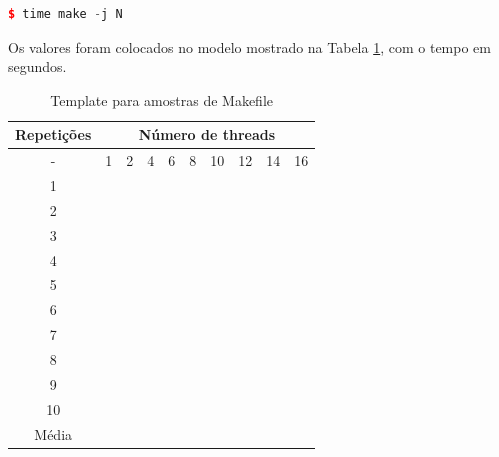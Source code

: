 \begin{lstlisting}[language=C++,caption={
							Execução de make utilizando jobs},
                                   			 label=codigo_29]
        $ time make -j N
\end{lstlisting}

Os valores foram colocados no modelo mostrado na Tabela \ref{tab:makefile},
 com o tempo em segundos.

\begin{table}[h]
\centering
\caption{Template para amostras de Makefile}
\label{tab:makefile}
\begin{tabular}{cccccccccc}
\toprule
\textbf{Repetições} & \multicolumn{9}{c}{\textbf{Número de threads}} \\ \midrule
- & 1 & 2 & 4 & 6 & 8 & 10 & 12 & 14 & 16 \\ 
1 &   &   &   &   &   &    &    &    &  \\ 
2 &   &   &   &   &   &    &    &    &   \\ 
3 &   &   &   &   &   &    &    &    &  \\ 
4 &   &   &   &   &   &    &    &    &  \\ 
5 &   &   &   &   &   &    &    &    &  \\ 
6 &   &   &   &   &   &    &    &    &  \\ 
7 &   &   &   &   &   &    &    &    &  \\ 
8 &   &   &   &   &   &    &    &    &  \\ 
9 &   &   &   &   &   &    &    &    &  \\ 
10 &  &   &   &   &   &    &    &    & \\ \midrule
Média & & &   &   &   &    &    &    & \\ \bottomrule
\end{tabular}
\end{table}
